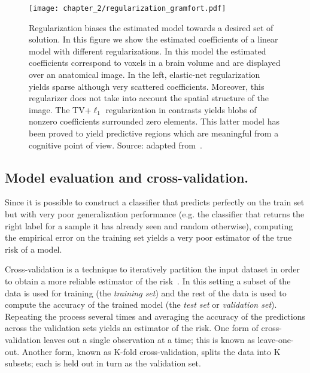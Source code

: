 \begin{figure}
\texttt{[image: chapter\_2/regularization\_gramfort.pdf]}
\caption{Regularization biases the estimated model towards a desired set of solution. 
In this figure we show the estimated coefficients of a linear model with different regularizations. 
In this model the estimated coefficients correspond to voxels in a brain volume and are displayed over an anatomical image.
In the left, elastic-net regularization yields sparse although very scattered coefficients. Moreover, this regularizer does not take into account the spatial structure of the image. The TV+$\ell_1$ regularization in contrasts yields blobs of nonzero coefficients surrounded zero elements. This latter model has been proved to yield predictive regions which are meaningful from a cognitive point of view. Source: adapted from~\citep{gramfort:hal-00839984}.}\label{fig:tv_reg}
\end{figure}


\vspace{20pt}





\subsection{Model evaluation and cross-validation.}


Since it is possible to construct a classifier that predicts perfectly on the train set but with very poor generalization performance (e.g. the classifier that returns the right label for a sample it has already seen and random otherwise), computing the empirical error on the training set yields a very poor estimator of the true risk of a model.


Cross-validation is a technique to iteratively partition the input dataset in order to obtain a more reliable estimator of the risk~\citep{mosteller1968data, stone1977asymptotics, geisser1975predictive, arlot2010survey}. In this setting a subset of the data is used for training (the \emph{training set}) and the rest of the data is used to compute the accuracy of the trained model (the \emph{test set} or \emph{validation set}). Repeating the process several times and averaging the accuracy of the predictions across the validation sets yields an estimator of the risk. One form of cross-validation leaves out a single observation at a time; this is known as leave-one-out. Another form, known as K-fold cross-validation, splits the data into K subsets; each is held out in turn as the validation set.



